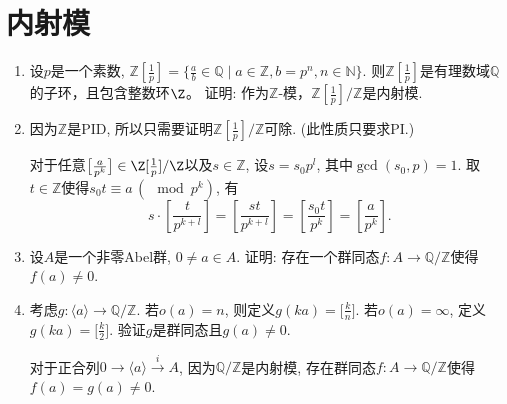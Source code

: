 \setcounter{section}{6}

\section{内射模}
    \begin{enumerate}
        \item[7.2] 设$p$是一个素数, $\mathbb{Z}[\frac{1}{p}]
        =\{\frac{a}{b}\in\mathbb{Q}\mid a\in\mathbb{Z},b=p^n,n\in \mathbb{N}\}$. 
        则$\mathbb{Z}[\frac{1}{p}]$是有理数域$\mathbb{Q}$的子环，且包含整数环$\Z$。
        证明: 作为$\mathbb{Z}$-模，$\mathbb{Z}[\frac{1}{p}]/\mathbb{Z}$是内射模.
        \item[\textbf{证明:}]  因为$\mathbb{Z}$是PID, 
        所以只需要证明$\mathbb{Z}[\frac{1}{p}]/\mathbb{Z}$可除.
        (此性质只要求PI.)\par
        对于任意$\big[\frac{a}{p^k}\big]\in\Z[\frac{1}{p}]/\Z$以及$s\in \mathbb{Z}$, 
        设$s=s_0p^l$, 其中$\gcd(s_0,p)=1$. 
        取$t\in\mathbb{Z}$使得$s_0t\equiv a\,(\!\!\!\mod p^k)$, 有
        $$s\cdot \left[\frac{t}{p^{k+l}}\right]=\left[\frac{st}{p^{k+l}}\right]
        =\left[\frac{s_0t}{p^k}\right]=\left[\frac{a}{p^k}\right].$$

        \item[7.3] 设$A$是一个非零Abel群, $0\neq a\in A$. 
        证明: 存在一个群同态$f:A\rightarrow \mathbb{Q}/\mathbb{Z}$使得$f(a)\neq 0$.
        \item[\textbf{证明:}] 考虑$g:\langle a\rangle
        \rightarrow \mathbb{Q}/\mathbb{Z}$. 
        若$o(a)=n$, 则定义$g(ka)=\big[\frac{k}{n}\big]$. 
        若$o(a)=\infty$, 定义$g(ka)=\big[\frac{k}{2}\big]$. 
        验证$g$是群同态且$g(a)\neq 0$.\par
        对于正合列$0\rightarrow \langle a\rangle\stackrel{i}{\rightarrow} A$, 
        因为$\mathbb{Q}/\mathbb{Z}$是内射模, 
        存在群同态$f: A\rightarrow \mathbb{Q}/\mathbb{Z}$使得$f(a)=g(a)\neq 0$.


\end{enumerate}
